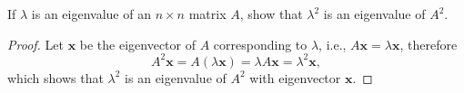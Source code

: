 \begin{pro}
  If $\lambda$ is an eigenvalue of an $n\times n$ matrix $A$,
  show that $\lambda^2$ is an eigenvalue of $A^2$.
\end{pro}
\begin{proof}
  Let $\mathbf{x}$ be the eigenvector of $A$ corresponding to $\lambda$,
  i.e., $A\mathbf{x}=\lambda\mathbf{x}$,
  therefore
  \begin{displaymath}
    A^2\mathbf{x} = A(\lambda\mathbf{x}) = \lambda A\mathbf{x}
    = \lambda^2\mathbf{x},
  \end{displaymath}
  which shows that $\lambda^2$ is an eigenvalue of $A^2$
  with eigenvector $\mathbf{x}$.
\end{proof}
